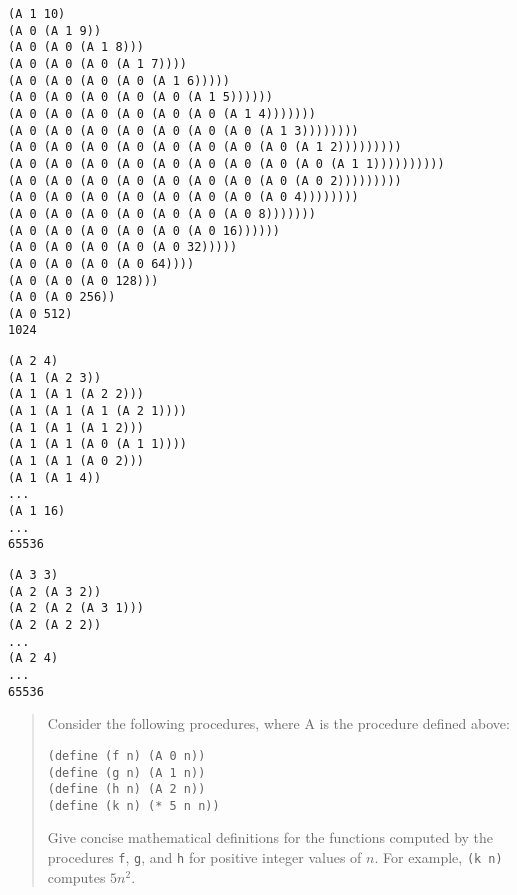 \documentclass{article}
\begin{document}
\begin{minipage}{\linewidth}
\begin{verbatim}
(A 1 10)
(A 0 (A 1 9))
(A 0 (A 0 (A 1 8)))
(A 0 (A 0 (A 0 (A 1 7))))
(A 0 (A 0 (A 0 (A 0 (A 1 6)))))
(A 0 (A 0 (A 0 (A 0 (A 0 (A 1 5))))))
(A 0 (A 0 (A 0 (A 0 (A 0 (A 0 (A 1 4)))))))
(A 0 (A 0 (A 0 (A 0 (A 0 (A 0 (A 0 (A 1 3))))))))
(A 0 (A 0 (A 0 (A 0 (A 0 (A 0 (A 0 (A 0 (A 1 2)))))))))
(A 0 (A 0 (A 0 (A 0 (A 0 (A 0 (A 0 (A 0 (A 0 (A 1 1))))))))))
(A 0 (A 0 (A 0 (A 0 (A 0 (A 0 (A 0 (A 0 (A 0 2)))))))))
(A 0 (A 0 (A 0 (A 0 (A 0 (A 0 (A 0 (A 0 4))))))))
(A 0 (A 0 (A 0 (A 0 (A 0 (A 0 (A 0 8)))))))
(A 0 (A 0 (A 0 (A 0 (A 0 (A 0 16))))))
(A 0 (A 0 (A 0 (A 0 (A 0 32)))))
(A 0 (A 0 (A 0 (A 0 64))))
(A 0 (A 0 (A 0 128)))
(A 0 (A 0 256))
(A 0 512)
1024
\end{verbatim}
\end{minipage}
\vspace{\baselineskip}

\begin{minipage}{\linewidth}
\begin{verbatim}
(A 2 4)
(A 1 (A 2 3))
(A 1 (A 1 (A 2 2)))
(A 1 (A 1 (A 1 (A 2 1))))
(A 1 (A 1 (A 1 2)))
(A 1 (A 1 (A 0 (A 1 1))))
(A 1 (A 1 (A 0 2)))
(A 1 (A 1 4))
...
(A 1 16)
...
65536
\end{verbatim}
\end{minipage}
\vspace{\baselineskip}

\begin{minipage}{\linewidth}
\begin{verbatim}
(A 3 3)
(A 2 (A 3 2))
(A 2 (A 2 (A 3 1)))
(A 2 (A 2 2))
...
(A 2 4)
...
65536
\end{verbatim}
\end{minipage}
\vspace{\baselineskip}

\begin{quote}
    Consider the following procedures, where A is the procedure defined above:

    \begin{lstlisting}
(define (f n) (A 0 n))
(define (g n) (A 1 n))
(define (h n) (A 2 n))
(define (k n) (* 5 n n))
    \end{lstlisting}

    Give concise mathematical definitions for the functions computed by the
    procedures \verb|f|, \verb|g|, and \verb|h| for positive integer values of
    $n $. For example, \verb|(k n)| computes $5n^2$.
\end{quote}
\end{document}
